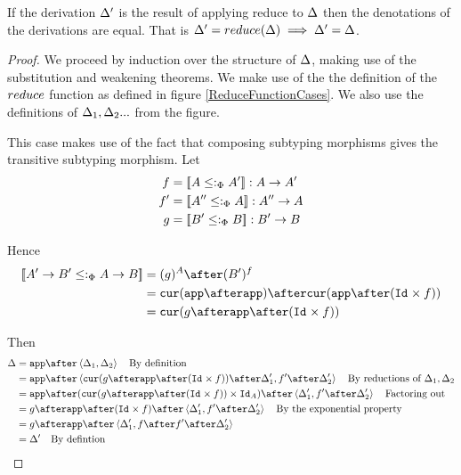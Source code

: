 \documentclass{Report}
\begin{document}
\begin{theorem}
   If the derivation $\Delta'$ is the result of applying  reduce to $\Delta$ then the denotations of the derivations are equal. That is $\Delta' = reduce(\Delta) \implies \Delta' = \Delta$.
\end{theorem}


\begin{proof}
    We proceed by induction over the structure of $\Delta$, making use of the substitution and weakening theorems. We make use of the the definition of the $reduce$ function as defined in figure \ref{ReduceFunctionCases}. We also use the definitions of $\Delta_1, \Delta_2 ...$ from the figure. 
    
    This case makes use of the fact that composing subtyping morphisms gives the transitive subtyping morphism.
        Let
        \begin{align}
            f & = {\bf [\![}A\leq:_\Phi A'{\bf ]\!]}: A\rightarrow A' \\
            f' & = {\bf [\![}A''\leq:_\Phi A{\bf ]\!]}: A'' \rightarrow A \\
            g & = {\bf [\![}B' \leq:_\Phi B{\bf ]\!]}: B' \rightarrow B \\
        \end{align}

        Hence 
        \begin{align}
            \deno{\fntype{A'}{B'}\subtypep \ab} & = (g)^A \after (B')^f \\
            & = \cur{\app\after \app}\after\cur{\app\after(\Id{}\times f)}\\
            & = \cur {g\after\app\after(\Id{}\times f)}
        \end{align}

        Then 
        \begin{align}
            \D & = \app\after\pr{\D_1}{\D_2}\qt{By definition}\\
            & = \app\after\pr{\cur {g\after\app\after(\Id{}\times f)}\after\D'_1}{f'\after\D'_2}\qt{By reductions of $\D_1, \D_2$}\\
            & = \app\after(\cur {g\after\app\after(\Id{}\times f)}\times\Id{A})\after\pr{\D'_1}{f'\after\D'_2} \qt{Factoring out}\\
            & = g\after\app\after(\Id{}\times f)\after\pr{\D'_1}{f'\after\D'_2}\qt{By the exponential property}\\
            & = g\after\app\after\pr{\D'_1}{f\after f'\after \D'_2}\\
            & = \D'\qt{By defintion}
        \end{align}
        

\end{proof}
\end{document}
